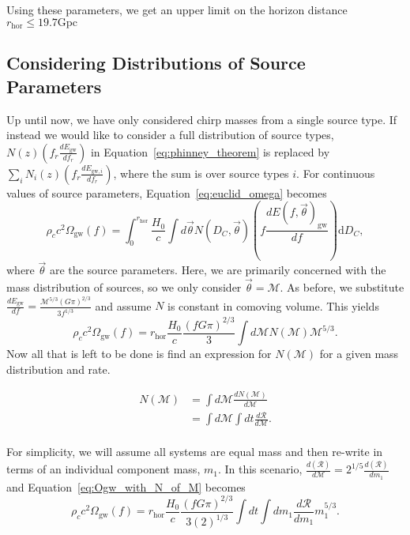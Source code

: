 \documentclass[]{article}
\newcommand{\Ogw}{\Omega_{\mathrm{gw}}}
\newcommand{\rhor}{r_{\text{hor}}}
\begin{document}
Using these parameters, we get an upper limit on the horizon distance $\boxed{r_{\text{hor}} \leq 19.7 \mathrm{Gpc}}$

\subsection{Considering Distributions of Source Parameters}
Up until now, we have only considered chirp masses from a single source type.
If instead we would like to consider a full distribution of source types, $N(z) (f_r \frac{dE_{\mathrm{gw}}}{df_r})$ in Equation~\ref{eq:phinney_theorem} is replaced by $\sum_{i} N_i (z) (f_r \frac{dE_{\mathrm{gw},i}}{df_r})$, where the sum is over source types $i$. 
For continuous values of source parameters, Equation~\ref{eq:euclid_omega} becomes
\begin{equation*}
\rho_c c^2 \Ogw(f) =  \int_{0}^{\rhor} \frac{H_0}{c} \int d\vec{\theta} N(D_C,\vec{\theta}) (f \frac{dE(f,\vec{\theta})_{\mathrm{gw}}}{df}) \mathrm{d}D_C ,
\end{equation*}
where $\vec{\theta}$ are the source parameters. 
Here, we are primarily concerned with the mass distribution of sources, so we only consider $\vec{\theta} = \mathcal{M}$.
As before, we substitute $\frac{dE_{\mathrm{gw}}}{df} = \frac{\mathcal{M}^{5/3}(G\pi)^{2/3}}{3 f^{1/3}}$ and assume $N$ is constant in comoving volume. 
This yields
\begin{equation}
\rho_c c^2 \Ogw(f) =  \rhor \frac{H_0}{c} \frac{(f G \pi)^{2/3}}{3} \int d\mathcal{M} N(\mathcal{M}) \mathcal{M}^{5/3}  .
\label{eq:Ogw_with_N_of_M}
\end{equation}
Now all that is left to be done is find an expression for $N(\mathcal{M})$ for a given mass distribution and rate.

\begin{align*}
 N(\mathcal{M}) &= \int d\mathcal{M} \frac{d N(\mathcal{M})}{d\mathcal{M}} \\
  &= \int d\mathcal{M} \int dt \frac{d\mathcal{R}}{d\mathcal{M}}.\\
\end{align*}

For simplicity, we will assume all systems are equal mass and then re-write in terms of an individual component mass, $m_1$.
In this scenario, $\frac{d(\mathcal{R})}{d\mathcal{M}} = 2^{1/5} \frac{d(\mathcal{R})}{d m_1}$ and Equation~\ref{eq:Ogw_with_N_of_M} becomes
\begin{equation}
\rho_c c^2 \Ogw(f) =  \rhor \frac{H_0}{c} \frac{(f G \pi)^{2/3}}{3 (2)^{1/3}} \int d t \int d m_1 \frac{d\mathcal{R}}{dm_1} m_1^{5/3} .
\label{eq:Ogw_with_R_of_M}
\end{equation}
\end{document}
